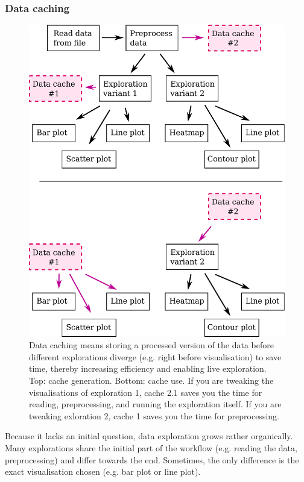 \documentclass[12pt,a4paper,notitlepage,onecolumn]{article}
\begin{document}
\subsubsection{Data caching}
\begin{figure}[h]
\begin{center}
\includegraphics[width=0.6\linewidth]{datacache.pdf}
\caption{Data caching means storing a processed version of the data before different explorations diverge (e.g. right before visualisation) to save time, thereby increasing efficiency and enabling live exploration. Top: cache generation. Bottom: cache use. If you are tweaking the visualisations of exploration 1, cache 2.1 saves you the time for reading, preprocessing, and running the exploration itself. If you are tweaking exloration 2, cache 1 saves you the time for preprocessing.}
\label{fig:datacache}
\end{center}
\end{figure}
Because it lacks an initial question, data exploration grows rather organically. Many explorations share the initial part of the workflow (e.g. reading the data, preprocessing) and differ towards the end. Sometimes, the only difference is the exact visualisation chosen (e.g. bar plot or line plot).
\end{document}
